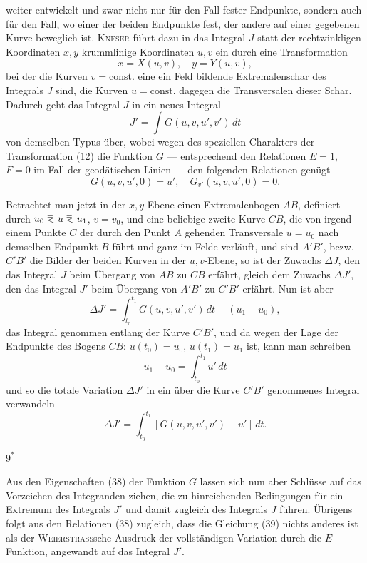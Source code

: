 weiter entwickelt und zwar nicht nur für den Fall fester Endpunkte, sondern
\clearpage{}
\noindent auch für den Fall, wo einer der beiden Endpunkte fest, der andere auf einer
gegebenen Kurve beweglich ist. \textsc{Kneser} führt dazu in das Integral $J$ statt
der rechtwinkligen Koordinaten $x,y$ krummlinige Koordinaten $u,v$ ein durch
eine Transformation
\begin{equation*}\tag{12}
x=X(u,v),\quad y=Y(u,v),
\end{equation*}
bei der die Kurven $v=\text{const.}$ eine ein Feld bildende Extremalenschar des
Integrals $J$ sind, die Kurven $u=\text{const.}$ dagegen die Transversalen dieser
Schar. Dadurch geht das Integral $J$ in ein neues Integral
\[
J'=\int G(u,v,u',v')\,dt
\]
von demselben Typus über, wobei wegen des speziellen Charakters der Transformation
(12) die Funktion $G$ — entsprechend den Relationen $E=1$, $F=0$
im Fall der geodätischen Linien — den folgenden Relationen genügt
\begin{equation*}\tag{38}
G(u,v,u',0)=u',\quad G_{v'}(u,v,u',0)=0.
\end{equation*}

Betrachtet man jetzt in der $x,y$-Ebene einen Extremalenbogen $AB$, definiert
durch $u_0\BolzaEqualAboveLess u\BolzaEqualAboveLess u_1$, $v=v_0$, und eine beliebige zweite Kurve $CB$, die
von irgend einem Punkte $C$ der durch den Punkt $A$ gehenden Transversale
$u=u_0$ nach demselben Endpunkt $B$ führt und ganz im Felde verläuft, und
sind $A'B'$, bezw. $C'B'$ die Bilder der beiden Kurven in der $u,v$-Ebene, so
ist der Zuwachs $\Delta J$, den das Integral $J$ beim Übergang von $AB$ zu $CB$ erfährt,
gleich dem Zuwachs $\Delta J'$, den das Integral $J'$ beim Übergang von $A'B'$
zu $C'B'$ erfährt. Nun ist aber
\[
\Delta J'=\int_{t_0}^{t_1}G(u,v,u',v')\,dt-(u_1-u_0),
\]
das Integral genommen entlang der Kurve $C'B'$, und da wegen der Lage der
Endpunkte des Bogens $CB$: $u(t_0)=u_0$, $u(t_1)=u_1$ ist, kann man schreiben
\[
u_1-u_0=\int_{t_0}^{t_1}u'\,dt
\]
und so die totale Variation $\Delta J'$ in ein über die Kurve $C'B'$ genommenes
Integral verwandeln
\begin{equation*}\tag{39}
\Delta J'=\int_{t_0}^{t_1}[G(u,v,u',v')-u']\,dt.
\end{equation*}
\par\smallskip\noindent\hfill$9^*$\par
\clearpage{}
\noindent\hspace*{\parindent}Aus den Eigenschaften (38) der Funktion $G$ lassen sich nun aber Schlüsse
auf das Vorzeichen des Integranden ziehen, die zu hinreichenden Bedingungen
für ein Extremum des Integrals $J'$ und damit zugleich des Integrals $J$ führen.
Übrigens folgt aus den Relationen (38) zugleich, dass die Gleichung (39) nichts
anderes ist als der \textsc{Weierstrass}sche Ausdruck der vollständigen Variation durch
die $E$-Funktion, angewandt auf das Integral $J'$.

